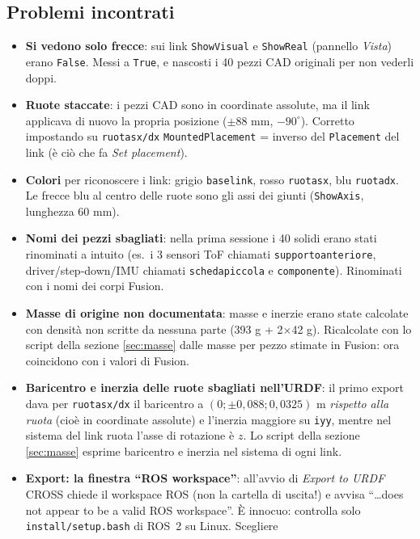 \documentclass[11pt,a4paper]{article}
\renewcommand{\_}{\oldunderscore\allowbreak}
\begin{document}
\subsection{Problemi incontrati}
\begin{itemize}[leftmargin=*]
  \item \textbf{Si vedono solo frecce}: sui link \texttt{ShowVisual} e \texttt{ShowReal} (pannello
    \emph{Vista}) erano \texttt{False}. Messi a \texttt{True}, e nascosti i 40 pezzi CAD originali
    per non vederli doppi.
  \item \textbf{Ruote staccate}: i pezzi CAD sono in coordinate assolute, ma il link applicava di nuovo la
    propria posizione ($\pm$88 mm, $-90^\circ$). Corretto impostando su \texttt{ruota\_sx/dx}
    \texttt{MountedPlacement} = inverso del \texttt{Placement} del link (\`e ci\`o che fa
    \emph{Set placement}).
  \item \textbf{Colori} per riconoscere i link: grigio \texttt{base\_link}, rosso \texttt{ruota\_sx}, blu
    \texttt{ruota\_dx}. Le frecce blu al centro delle ruote sono gli assi dei giunti
    (\texttt{ShowAxis}, lunghezza 60 mm).
  \item \textbf{Nomi dei pezzi sbagliati}: nella prima sessione i 40 solidi erano stati rinominati a
    intuito (es.\ i 3 sensori ToF chiamati \texttt{supporto\_anteriore\_*}, driver/step-down/IMU chiamati
    \texttt{scheda\_piccola\_*} e \texttt{componente\_1}). Rinominati con i nomi dei corpi Fusion.
  \item \textbf{Masse di origine non documentata}: masse e inerzie erano state calcolate con densit\`a
    non scritte da nessuna parte (393 g + 2$\times$42 g). Ricalcolate con lo script della sezione
    \ref{sec:masse} dalle masse per pezzo stimate in Fusion: ora coincidono con i valori di Fusion.
  \item \textbf{Baricentro e inerzia delle ruote sbagliati nell'URDF}: il primo export dava per
    \texttt{ruota\_sx/dx} il baricentro a $(0;\pm0{,}088;0{,}0325)$ m \emph{rispetto alla ruota} (cio\`e
    in coordinate assolute) e l'inerzia maggiore su \texttt{iyy}, mentre nel sistema del link ruota
    l'asse di rotazione \`e $z$. Lo script della sezione \ref{sec:masse} esprime baricentro e inerzia nel
    sistema di ogni link.
  \item \textbf{Export: la finestra ``ROS workspace''}: all'avvio di \emph{Export to URDF} CROSS chiede
    il workspace ROS (non la cartella di uscita!) e avvisa ``\ldots does not appear to be a valid ROS
    workspace''. \`E innocuo: controlla solo \texttt{install/setup.bash} di ROS~2 su Linux. Scegliere

\end{itemize}
\end{document}
